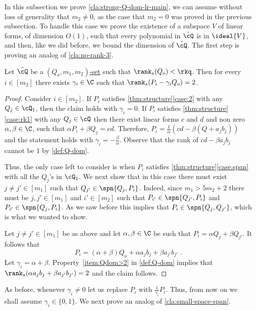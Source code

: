 In this subsection we prove  \autoref{cla:strong-Q-dom-lr-main}, we can assume without loss of generality that $m_2 \neq 0$, as the case that $m_2=0$ was proved in the previous subsection.
To handle this case we prove the existence of a subspace $V$ of linear forms, of dimension $O(1)$, such that every polynomial in $\tilde{\cQ}$ is in $\ideal{V}$, and then, like we did before, we bound the dimension of $\tilde{\cQ}$. The first step is proving an analog of \autoref{cla:no-rank-3}.

\begin{claim}\label{cla:Q-and-rank-2}
Let $\tilde{\cQ}$ be a \hyperref[def:Q-dom]{$(Q_o,m_1,m_2)$-set} such that $\rank_s(Q_o)< \rkq$. Then for every $i \in [m_2]$ there exists $ \gamma_i\in \C$  such that $\rank_s(P_i-\gamma_i Q_o) = 2$.
\end{claim}

\begin{proof}
Consider $i\in [m_2]$. If $P_i$ satisfies \autoref{thm:structure}\ref{case:2} with any $Q_j\in \cQ_1$, then the claim holds with $\gamma_i=0$. 
If $P_i$ satisfies \autoref{thm:structure}\ref{case:rk1} with any $Q_j\in \cQ$ then there exist linear forms  $c$ and $d$ and non zero $\alpha, \beta \in \C$, such that $\alpha P_i + \beta Q_j = cd$. Therefore, $
P_i = \frac{1}{\alpha}(cd - \beta (Q+a_j b_j))$
and the statement holds with $\gamma_i = -\frac{\beta}{\alpha}$. Observe that the rank of $cd - \beta a_j b_j$ cannot be $1$ by \autoref{def:Q-dom}.


Thus, the only case left to consider is when $P_i$ satisfies  \autoref{thm:structure}\ref{case:span} with all the $Q_j$'s in $\cQ_1$. 
We next show that in this case there must exist $j\neq j' \in [m_1]$ such that $Q_{j'}\in \spn{Q_j,P_i}$. Indeed,  since $m_1 >  5m_2+2$ there must be $j,j'\in[m_1]$ and $i'\in[m_2]$ such that
$P_{i'} \in \spn{Q_{j'}, P_i}$ and $ P_{i'} \in \spn{Q_{j}, P_i}$. As we saw before this implies that $P_i \in \spn{Q_j,Q_{j'}}$, which is what we wanted to show.

Let  $j \neq j' \in [m_1]$ be as above and let $\alpha, \beta \in \C$ be such that $P_i =\alpha Q_j + \beta Q_{j'}$.  It follows that
\[
P_i = (\alpha + \beta)Q_o+ \alpha a_j b_j + \beta a_{j'} b_{j'}\;.
\] 
Let $\gamma_i = \alpha + \beta$. Property~\ref{item:Qdom>2} in \autoref{def:Q-dom} implies that $\rank_s(\alpha a_j b_j + \beta a_{j'} b_{j'})=2$ and the claim follows.
\end{proof}

As before, whenever $\gamma_i\neq 0$ let us replace $P_i$ with $\frac{1}{\gamma_i}P_i$. Thus, from now on we shall assume $\gamma_i \in \{0,1\}$.
We next prove an analog of \autoref{cla:small-space-span}.

